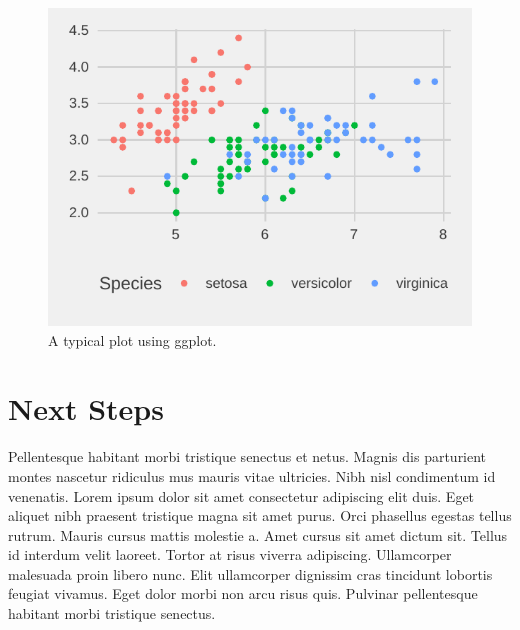 \documentclass[article,30pt,extrafontsizes]{memoir}
\begin{document}
\begin{adjmulticols*}{3}{10mm}{10mm}
{\begin{figure}
{\centering \includegraphics[width=0.75\linewidth]{skeleton_files/figure-latex/unnamed-chunk-5-1} 

}

\caption{A typical plot using ggplot.}\label{fig:unnamed-chunk-5}
\end{figure}

\section{Next Steps}\label{next-steps}

Pellentesque habitant morbi tristique senectus et netus. Magnis dis
parturient montes nascetur ridiculus mus mauris vitae ultricies. Nibh
nisl condimentum id venenatis. Lorem ipsum dolor sit amet consectetur
adipiscing elit duis. Eget aliquet nibh praesent tristique magna sit
amet purus. Orci phasellus egestas tellus rutrum. Mauris cursus mattis
molestie a. Amet cursus sit amet dictum sit. Tellus id interdum velit
laoreet. Tortor at risus viverra adipiscing. Ullamcorper malesuada proin
libero nunc. Elit ullamcorper dignissim cras tincidunt lobortis feugiat
vivamus. Eget dolor morbi non arcu risus quis. Pulvinar pellentesque
habitant morbi tristique senectus.

\small
\printbibliography
}
\end{adjmulticols*}
\end{document}
